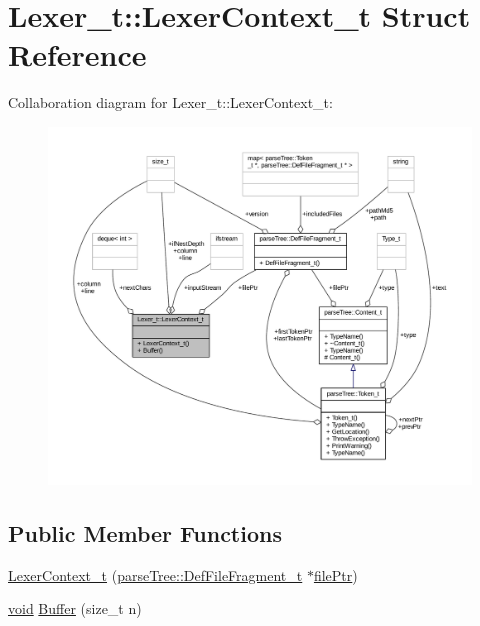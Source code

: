 \hypertarget{struct_lexer__t_1_1_lexer_context__t}{}\section{Lexer\+\_\+t\+:\+:Lexer\+Context\+\_\+t Struct Reference}
\label{struct_lexer__t_1_1_lexer_context__t}


Collaboration diagram for Lexer\+\_\+t\+:\+:Lexer\+Context\+\_\+t\+:
\nopagebreak
\begin{figure}[H]
\begin{center}
\leavevmode
\includegraphics[width=350pt]{struct_lexer__t_1_1_lexer_context__t__coll__graph}
\end{center}
\end{figure}
\subsection*{Public Member Functions}
\begin{DoxyCompactItemize}
\item 
\hyperlink{struct_lexer__t_1_1_lexer_context__t_a8725ca34eebb6818858bd180c73f364e}{Lexer\+Context\+\_\+t} (\hyperlink{structparse_tree_1_1_def_file_fragment__t}{parse\+Tree\+::\+Def\+File\+Fragment\+\_\+t} $\ast$\hyperlink{struct_lexer__t_1_1_lexer_context__t_a7a7490749571aad6a55775e2f3e11b64}{file\+Ptr})
\item 
\hyperlink{_t_e_m_p_l_a_t_e__cdef_8h_ac9c84fa68bbad002983e35ce3663c686}{void} \hyperlink{struct_lexer__t_1_1_lexer_context__t_a4d8327a015cb57f3e457e7d7587cab6d}{Buffer} (size\+\_\+t n)
\end{DoxyCompactItemize}
